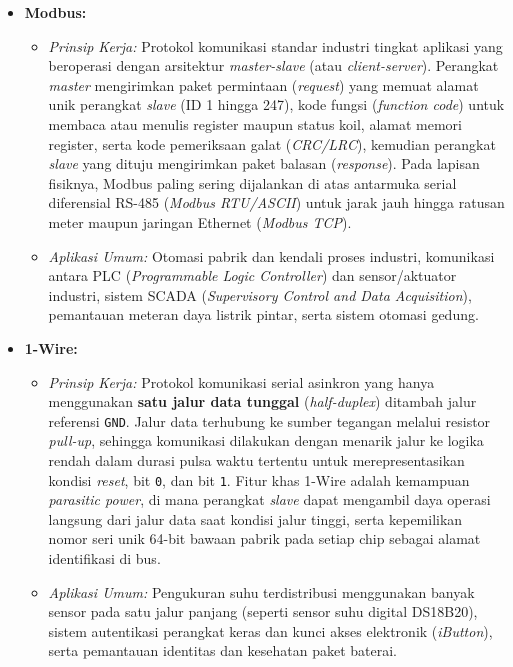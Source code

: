 \begin{enumerate}[label=\textbf{\arabic*.}, leftmargin=*, itemsep=10pt]
\begin{itemize}
        \item \textbf{Modbus:}
        \begin{itemize}
            \item \textit{Prinsip Kerja:} Protokol komunikasi standar industri tingkat aplikasi yang beroperasi dengan arsitektur \textit{master-slave} (atau \textit{client-server}). Perangkat \textit{master} mengirimkan paket permintaan (\textit{request}) yang memuat alamat unik perangkat \textit{slave} (ID 1 hingga 247), kode fungsi (\textit{function code}) untuk membaca atau menulis register maupun status koil, alamat memori register, serta kode pemeriksaan galat (\textit{CRC/LRC}), kemudian perangkat \textit{slave} yang dituju mengirimkan paket balasan (\textit{response}). Pada lapisan fisiknya, Modbus paling sering dijalankan di atas antarmuka serial diferensial RS-485 (\textit{Modbus RTU/ASCII}) untuk jarak jauh hingga ratusan meter maupun jaringan Ethernet (\textit{Modbus TCP}).
            \item \textit{Aplikasi Umum:} Otomasi pabrik dan kendali proses industri, komunikasi antara PLC (\textit{Programmable Logic Controller}) dan sensor/aktuator industri, sistem SCADA (\textit{Supervisory Control and Data Acquisition}), pemantauan meteran daya listrik pintar, serta sistem otomasi gedung.
        \end{itemize}

        \item \textbf{1-Wire:}
        \begin{itemize}
            \item \textit{Prinsip Kerja:} Protokol komunikasi serial asinkron yang hanya menggunakan \textbf{satu jalur data tunggal} (\textit{half-duplex}) ditambah jalur referensi \texttt{GND}. Jalur data terhubung ke sumber tegangan melalui resistor \textit{pull-up}, sehingga komunikasi dilakukan dengan menarik jalur ke logika rendah dalam durasi pulsa waktu tertentu untuk merepresentasikan kondisi \textit{reset}, bit \texttt{0}, dan bit \texttt{1}. Fitur khas 1-Wire adalah kemampuan \textit{parasitic power}, di mana perangkat \textit{slave} dapat mengambil daya operasi langsung dari jalur data saat kondisi jalur tinggi, serta kepemilikan nomor seri unik 64-bit bawaan pabrik pada setiap chip sebagai alamat identifikasi di bus.
            \item \textit{Aplikasi Umum:} Pengukuran suhu terdistribusi menggunakan banyak sensor pada satu jalur panjang (seperti sensor suhu digital DS18B20), sistem autentikasi perangkat keras dan kunci akses elektronik (\textit{iButton}), serta pemantauan identitas dan kesehatan paket baterai.
        \end{itemize}
    \end{itemize}


\end{enumerate}
